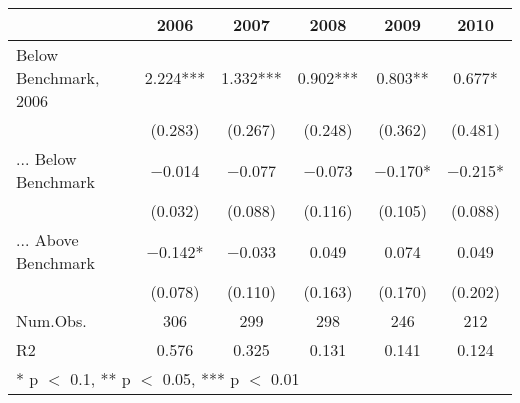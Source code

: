 \begin{table}
\centering
\begin{tabular}[t]{lccccc}
\toprule
  & 2006 & 2007 & 2008 & 2009 & 2010\\
\midrule
Below Benchmark, 2006 & \num{2.224}*** & \num{1.332}*** & \num{0.902}*** & \num{0.803}** & \num{0.677}*\\
 & (\num{0.283}) & (\num{0.267}) & (\num{0.248}) & (\num{0.362}) & (\num{0.481})\\
... Below Benchmark & \num{-0.014} & \num{-0.077} & \num{-0.073} & \num{-0.170}* & \num{-0.215}*\\
 & (\num{0.032}) & (\num{0.088}) & (\num{0.116}) & (\num{0.105}) & (\num{0.088})\\
... Above Benchmark & \num{-0.142}* & \num{-0.033} & \num{0.049} & \num{0.074} & \num{0.049}\\
 & (\num{0.078}) & (\num{0.110}) & (\num{0.163}) & (\num{0.170}) & (\num{0.202})\\
\midrule
Num.Obs. & \num{306} & \num{299} & \num{298} & \num{246} & \num{212}\\
R2 & \num{0.576} & \num{0.325} & \num{0.131} & \num{0.141} & \num{0.124}\\
\bottomrule
\multicolumn{6}{l}{\rule{0pt}{1em}* p $<$ 0.1, ** p $<$ 0.05, *** p $<$ 0.01}\\
\end{tabular}
\end{table}
